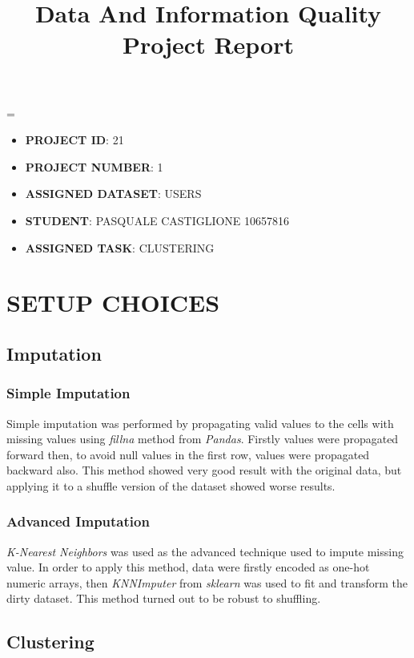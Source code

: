 \documentclass{article}
\title{
	\vspace{4cm}
	\textbf{Data And Information Quality Project Report}\\
}
\author{}
\date{}
\newcommand{\justified}
{
	\tolerance=1
	\emergencystretch=\maxdimen
	\hyphenpenalty=10000
	\hbadness=10000
}
\begin{document}
\maketitle
\vfill
\justified
\begin{itemize}
	\item\textbf{PROJECT ID}: 21
	\item\textbf{PROJECT NUMBER}: 1
	\item\textbf{ASSIGNED DATASET}: USERS
	\item\textbf{STUDENT}: PASQUALE CASTIGLIONE 10657816
	\item\textbf{ASSIGNED TASK}: CLUSTERING
\end{itemize}

\newpage

\tableofcontents

\newpage



\section{SETUP CHOICES}

\subsection{Imputation}
\subsubsection{Simple Imputation}
Simple imputation was performed by propagating valid values to the cells with missing values using \emph{fillna} method from \emph{Pandas}. Firstly values were propagated forward then, to avoid null values in the first row, values were propagated backward also. This method showed very good result with the original data, but applying it to a shuffle version of the dataset showed worse results.  
\subsubsection{Advanced Imputation}
\emph{K-Nearest Neighbors} was used as the advanced technique used to impute missing value. In order to apply this method, data were firstly encoded as one-hot numeric arrays, then \emph{KNNImputer} from \emph{sklearn} was used to fit and transform the dirty dataset.
This method turned out to be robust to shuffling.

\subsection{Clustering}
\end{document}
